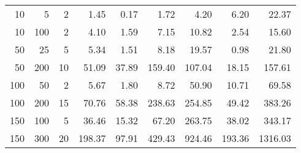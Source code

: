 \begin{tabular}{rrrrrrrrr}
\toprule
  10 &    5 &   2 &   1.45 &  0.17 &   1.72 &   4.20 &   6.20 &   22.37 \\
  10 &  100 &   2 &   4.10 &  1.59 &   7.15 &  10.82 &   2.54 &   15.60 \\
  50 &   25 &   5 &   5.34 &  1.51 &   8.18 &  19.57 &   0.98 &   21.80 \\
  50 &  200 &  10 &  51.09 & 37.89 & 159.40 & 107.04 &  18.15 &  157.61 \\
 100 &   50 &   2 &   5.67 &  1.80 &   8.72 &  50.90 &  10.71 &   69.58 \\
 100 &  200 &  15 &  70.76 & 58.38 & 238.63 & 254.85 &  49.42 &  383.26 \\
 150 &  100 &   5 &  36.46 & 15.32 &  67.20 & 263.75 &  38.02 &  343.17 \\
 150 &  300 &  20 & 198.37 & 97.91 & 429.43 & 924.46 & 193.36 & 1316.03 \\
\bottomrule
\end{tabular}
